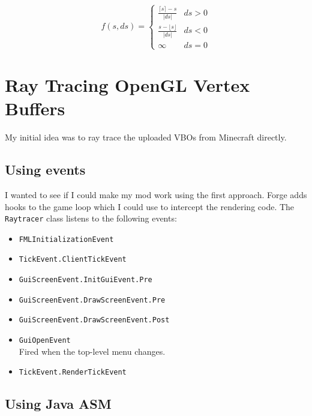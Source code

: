 \documentclass[]{article}
\begin{document}
\begin{equation}
  f(s, ds) =
  \begin{cases}
    \frac{\lceil s \rceil - s}{\lvert ds \rvert} & ds > 0 \\
    \frac{s - \lfloor s \rfloor}{\lvert ds \rvert} & ds < 0 \\
    \infty & ds = 0
  \end{cases}
\end{equation}

\section{Ray Tracing OpenGL Vertex Buffers}
My initial idea was to ray trace the uploaded VBOs from Minecraft directly.


\subsection{Using events}
I wanted to see if I could make my mod work using the first approach.
Forge adds hooks to the game loop which I could use to intercept the rendering code.
The \texttt{Raytracer} class listens to the following events:
\begin{itemize}
  \item \texttt{FMLInitializationEvent}
  \item \texttt{TickEvent.ClientTickEvent} \\
    
  \item \texttt{GuiScreenEvent.InitGuiEvent.Pre} \\
    
  \item \texttt{GuiScreenEvent.DrawScreenEvent.Pre} \\
    
  \item \texttt{GuiScreenEvent.DrawScreenEvent.Post} \\
    
  \item \texttt{GuiOpenEvent} \\
    Fired when the top-level menu changes.
  \item \texttt{TickEvent.RenderTickEvent} \\
    
\end{itemize}

\subsection{Using Java ASM}
\end{document}
